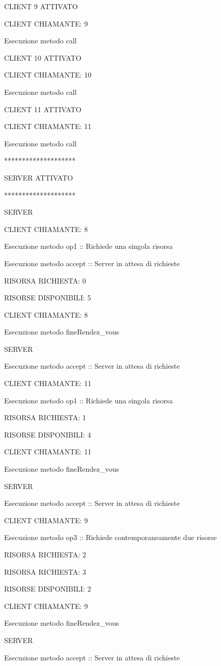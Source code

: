 \documentclass[10pt, a4paper]{article}
\begin{document}
CLIENT 9 ATTIVATO

CLIENT CHIAMANTE: 9

Esecuzione metodo call

CLIENT 10 ATTIVATO

CLIENT CHIAMANTE: 10

Esecuzione metodo call

CLIENT 11 ATTIVATO

CLIENT CHIAMANTE: 11

Esecuzione metodo call

********************

SERVER ATTIVATO

********************

SERVER

CLIENT CHIAMANTE: 8

Esecuzione metodo op1 :: Richiede una singola risorsa

Esecuzione metodo accept :: Server in attesa di richieste

RISORSA RICHIESTA: 0

RISORSE DISPONIBILI: 5

CLIENT CHIAMANTE: 8

Esecuzione metodo fineRendez\_vous

SERVER

Esecuzione metodo accept :: Server in attesa di richieste

CLIENT CHIAMANTE: 11

Esecuzione metodo op1 :: Richiede una singola risorsa

RISORSA RICHIESTA: 1

RISORSE DISPONIBILI: 4

CLIENT CHIAMANTE: 11

Esecuzione metodo fineRendez\_vous

SERVER

Esecuzione metodo accept :: Server in attesa di richieste

CLIENT CHIAMANTE: 9

Esecuzione metodo op3 :: Richiede contemporaneamente due risorse

RISORSA RICHIESTA: 2

RISORSA RICHIESTA: 3

RISORSE DISPONIBILI: 2

CLIENT CHIAMANTE: 9

Esecuzione metodo fineRendez\_vous

SERVER

Esecuzione metodo accept :: Server in attesa di richieste
\end{document}
